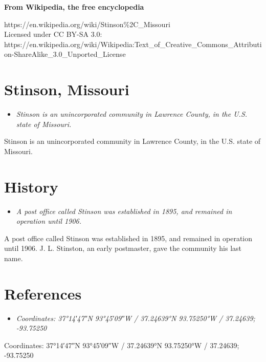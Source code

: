 \textbf{From Wikipedia, the free encyclopedia}

https://en.wikipedia.org/wiki/Stinson\%2C\_Missouri\\
Licensed under CC BY-SA 3.0:\\
https://en.wikipedia.org/wiki/Wikipedia:Text\_of\_Creative\_Commons\_Attribution-ShareAlike\_3.0\_Unported\_License

\section{Stinson, Missouri}\label{stinson-missouri}

\begin{itemize}
\item
  \emph{Stinson is an unincorporated community in Lawrence County, in
  the U.S. state of Missouri.}
\end{itemize}

Stinson is an unincorporated community in Lawrence County, in the U.S.
state of Missouri.

\section{History}\label{history}

\begin{itemize}
\item
  \emph{A post office called Stinson was established in 1895, and
  remained in operation until 1906.}
\end{itemize}

A post office called Stinson was established in 1895, and remained in
operation until 1906. J. L. Stinston, an early postmaster, gave the
community his last name.

\section{References}\label{references}

\begin{itemize}
\item
  \emph{Coordinates: 37°14′47″N 93°45′09″W﻿ / ﻿37.24639°N 93.75250°W﻿ /
  37.24639; -93.75250}
\end{itemize}

Coordinates: 37°14′47″N 93°45′09″W﻿ / ﻿37.24639°N 93.75250°W﻿ /
37.24639; -93.75250
